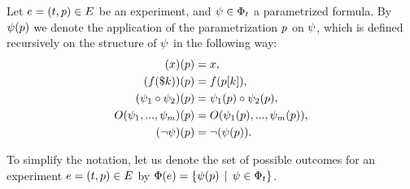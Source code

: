 Let $e = (t, p)\in E$ be an experiment,
  and $\psi\in\Phi_t$ a parametrized formula.
By $\psi(p)$ we denote the application of
  the parametrization $p$ on $\psi$,
  which is defined recursively on the structure of $\psi$
  in the following way:
\begin{align}
(x)(p) &= x, \\
(f(\$k))(p) &= f(p[k]),\\
(\psi_1\circ\psi_2)(p) &= \psi_1(p) \circ \psi_2(p),\\
O(\psi_1, ..., \psi_m)(p) &= O(\psi_1(p), ..., \psi_m(p)),\\
(\neg\psi)(p) &= \neg(\psi(p)).
\end{align}

To simplify the notation, let us denote the set of possible outcomes for
  an experiment $e = (t, p) \in E$ by
  $\Phi(e) = \{ \psi(p) \:\:|\:\: \psi\in\Phi_t\}$.

